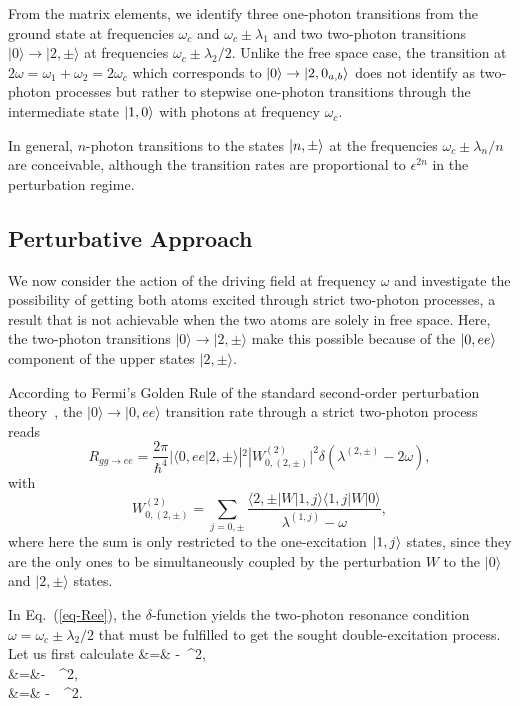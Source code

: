 From the matrix elements, we identify three one-photon transitions from the ground state at frequencies $\omega_c$ and $\omega_c \pm \lambda_1$ and two two-photon transitions $|0\rangle \rightarrow |2,\pm\rangle$ at frequencies $\omega_c \pm \lambda_2/2$.  Unlike the free space case, the transition at $2\omega=\omega_1+\omega_2=2\omega_c$ which corresponds to $| 0 \rangle \rightarrow | 2,0_{a,b} \rangle$ does not identify as two-photon processes but rather to stepwise one-photon transitions through the intermediate state $| 1,0 \rangle$ with photons at frequency $\omega_c$.

In general, $n$-photon transitions to the states $| n,\pm \rangle$ at the frequencies $\omega_c \pm \lambda_n/n$ are conceivable, although the transition rates are proportional to $\epsilon^{2n}$ in the perturbation regime.

\subsection{Perturbative Approach}

We now consider the action of the driving field at frequency $\omega$ and investigate the possibility of getting both atoms excited through strict two-photon processes, a result that is not achievable when the two atoms are solely in free space. Here, the two-photon transitions $|0\rangle \rightarrow |2,\pm\rangle$ make this possible because of the $| 0,ee \rangle$ component of the upper states $|2,\pm\rangle$.

According to Fermi's Golden Rule of the standard second-order perturbation theory~\cite{Lou00}, the $|0\rangle \rightarrow |0,ee\rangle$ transition rate through a strict two-photon process reads
\[ R_{gg \rightarrow ee} = \frac{2 \pi}{\hbar^4} |\langle 0,ee | 2,\pm \rangle|^2 |W^{(2)}_{0,(2,\pm)}|^2 \delta(\lambda^{(2,\pm)} - 2\omega), \label{eq-Ree}\]
with
\[  W^{(2)}_{0,(2,\pm)} = \sum_{j=0,\pm} \frac{\langle 2,\pm | W |1, j\rangle \langle 1,j | W |0\rangle}{\lambda^{(1,j)}-\omega},\]
where here the sum is only restricted to the one-excitation $| 1,j \rangle$ states, since they are the only ones to be simultaneously coupled by the perturbation $W$  to the $|0\rangle$ and $|2,\pm\rangle$ states.

In Eq.~(\ref{eq-Ree}), the $\delta$-function yields the two-photon resonance condition $\omega = \omega_c \pm \lambda_2/2$ that must be fulfilled to get the sought double-excitation process.  Let us first calculate
\bea
{} &=&  -  \,\epsilon^2, \\
 &=&- \, \,\epsilon^2,\\
 &=& - \, \,\epsilon^2.
\eea

